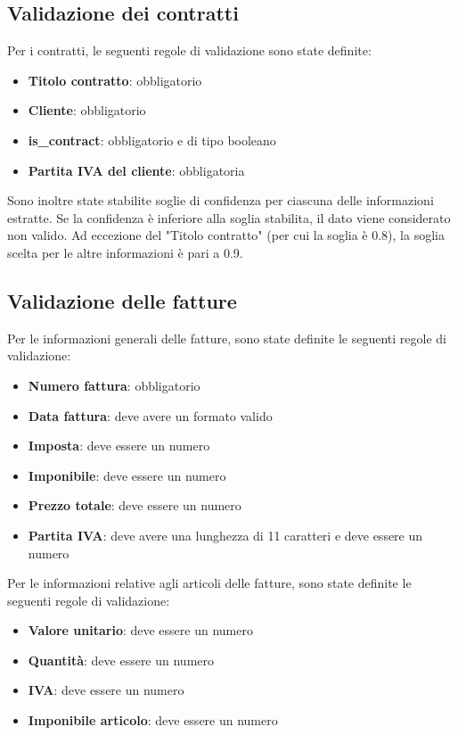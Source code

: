 \subsection{Validazione dei contratti}
\label{subsec:validazione-contratti}
Per i contratti, le seguenti regole di validazione sono state definite:

\begin{itemize}
    \item \textbf{Titolo contratto}: obbligatorio
    \item \textbf{Cliente}: obbligatorio
    \item \textbf{is\_contract}: obbligatorio e di tipo booleano
    \item \textbf{Partita IVA del cliente}: obbligatoria
\end{itemize}

Sono inoltre state stabilite soglie di confidenza per ciascuna delle informazioni estratte. Se la confidenza è inferiore alla soglia stabilita, il dato viene considerato non valido. Ad eccezione del "Titolo contratto" (per cui la soglia è 0.8), la soglia scelta per le altre informazioni è pari a 0.9.

\subsection{Validazione delle fatture}
\label{subsec:validazione-fatture}
Per le informazioni generali delle fatture, sono state definite le seguenti regole di validazione:

\begin{itemize}
    \item \textbf{Numero fattura}: obbligatorio
    \item \textbf{Data fattura}: deve avere un formato valido
    \item \textbf{Imposta}: deve essere un numero
    \item \textbf{Imponibile}: deve essere un numero
    \item \textbf{Prezzo totale}: deve essere un numero
    \item \textbf{Partita IVA}: deve avere una lunghezza di 11 caratteri e deve essere un numero
\end{itemize}

Per le informazioni relative agli articoli delle fatture, sono state definite le seguenti regole di validazione:

\begin{itemize}
    \item \textbf{Valore unitario}: deve essere un numero
    \item \textbf{Quantità}: deve essere un numero
    \item \textbf{IVA}: deve essere un numero
    \item \textbf{Imponibile articolo}: deve essere un numero
\end{itemize}

